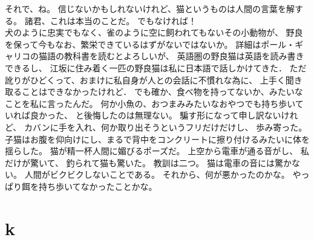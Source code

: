 \documentclass[]{article}
\begin{document}
それで、ね。
信じないかもしれないけれど、猫というものは人間の言葉を解する。
諸君、これは本当のことだ。
でもなければ！\\犬のように忠実でもなく、雀のように空に飼われてもないその小動物が、
野良を保って今もなお、繁栄できているはずがないではないか。
詳細はポール・ギャリコの猫語の教科書を読むとよろしいが、
英語圏の野良猫は英語を読み書きできるし、
江坂に住み着く一匹の野良猫は私に日本語で話しかけてきた．
ただ訛りがひどくって、おまけに私自身が人との会話に不慣れな為に、
上手く聞き取ることはできなかったけれど．
でも確か、食べ物を持ってないか、みたいなことを私に言ったんだ。
何か小魚の、おつまみみたいなおやつでも持ち歩いていれば良かった、
と後悔したのは無理ない。 騙す形になって申し訳ないけれど、
カバンに手を入れ、何か取り出そうというフリだけだけし、 歩み寄った。
子猫はお腹を仰向けにし、まるで背中をコンクリートに擦り付けるみたいに体を揺らした。
猫が精一杯人間に媚びるポーズだ。 上空から電車が通る音がし、
私だけが驚いて、 釣られて猫も驚いた。 教訓は二つ。
猫は電車の音には驚かない。 人間がビクビクしないことである。
それから、何が悪かったのかな。 やっぱり餌を持ち歩いてなかったことかな。

\section{k}\label{k}
\end{document}
